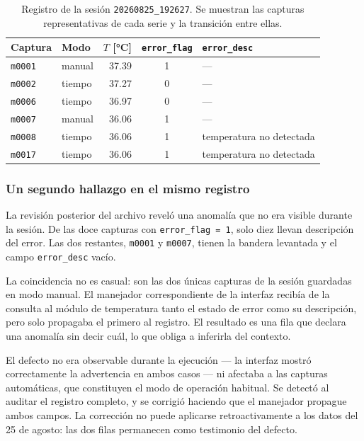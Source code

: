 \begin{table}[H]
  \centering
  \caption{Registro de la sesión \texttt{20260825\_192627}. Se muestran
           las capturas representativas de cada serie y la transición
           entre ellas.}
  \label{tab:sesion_25ago}
  \begin{tabular}{llrcl}
    \toprule
    \textbf{Captura} & \textbf{Modo} & \textbf{$T$ [\si{\celsius}]} &
    \textbf{\texttt{error\_flag}} & \textbf{\texttt{error\_desc}} \\
    \midrule
    \texttt{m0001} & manual & 37.39 & 1 & --- \\
    \texttt{m0002} & tiempo & 37.27 & 0 & --- \\
    \texttt{m0006} & tiempo & 36.97 & 0 & --- \\
    \midrule
    \texttt{m0007} & manual & 36.06 & 1 & --- \\
    \texttt{m0008} & tiempo & 36.06 & 1 & temperatura no detectada \\
    \texttt{m0017} & tiempo & 36.06 & 1 & temperatura no detectada \\
    \bottomrule
  \end{tabular}
\end{table}

\subsubsection*{Un segundo hallazgo en el mismo registro}

La revisión posterior del archivo reveló una anomalía que no era
visible durante la sesión. De las doce capturas con
\texttt{error\_flag = 1}, solo diez llevan descripción del error.
Las dos restantes, \texttt{m0001} y \texttt{m0007}, tienen la bandera
levantada y el campo \texttt{error\_desc} vacío.

La coincidencia no es casual: son las dos únicas capturas de la sesión
guardadas en modo manual. El manejador correspondiente de la interfaz
recibía de la consulta al módulo de temperatura tanto el estado de
error como su descripción, pero solo propagaba el primero al registro.
El resultado es una fila que declara una anomalía sin decir cuál, lo
que obliga a inferirla del contexto.

El defecto no era observable durante la ejecución --- la interfaz
mostró correctamente la advertencia en ambos casos --- ni afectaba a
las capturas automáticas, que constituyen el modo de operación
habitual. Se detectó al auditar el registro completo, y se corrigió
haciendo que el manejador propague ambos campos. La corrección no
puede aplicarse retroactivamente a los datos del 25 de agosto: las dos
filas permanecen como testimonio del defecto.


